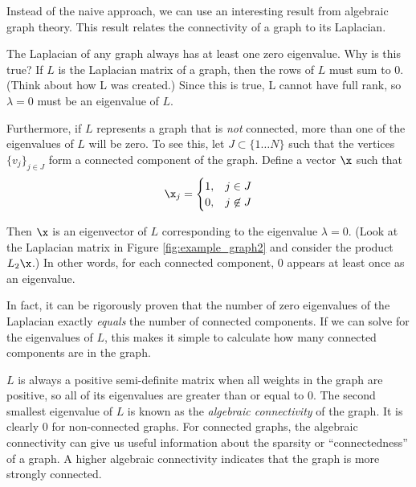 Instead of the naive approach, we can use an interesting result from algebraic graph theory.
This result relates the connectivity of a graph to its Laplacian.

The Laplacian of any graph always has at least one zero eigenvalue.
Why is this true?  If $L$ is the Laplacian matrix of a graph, then the rows of $L$ must sum to 0.
(Think about how L was created.)
Since this is true, L cannot have full rank, so $\lambda = 0$ must be an eigenvalue of $L$.

Furthermore, if $L$ represents a graph that is \textit{not} connected, more than one of the eigenvalues of $L$ will be zero.
To see this, let $J \subset \{1 \dots N\}$ such that the vertices $\{v_j\}_{j \in J}$ form a connected component of the graph.
Define a vector $\x$ such that
 \[
    \x_j = \begin{cases}
        1, & j \in J \\
        0, & j \not\in J
        \end{cases}
  \]

Then $\x$ is an eigenvector of $L$ corresponding to the eigenvalue $\lambda = 0$.
(Look at the Laplacian matrix in Figure \ref{fig:example_graph2} and consider the product $L_2 \x$.)
In other words, for each connected component, 0 appears at least once as an eigenvalue.

In fact, it can be rigorously proven that the number of zero eigenvalues of the Laplacian exactly \textit{equals} the number of connected components.
If we can solve for the eigenvalues of $L$, this makes it simple to calculate how many connected components are in the graph.

$L$ is always a positive semi-definite matrix when all weights in the graph are positive, so all of its eigenvalues are greater than or equal to 0.
The second smallest eigenvalue of $L$ is known as the \textit{algebraic connectivity} of the graph.
It is clearly 0 for non-connected graphs.
For connected graphs, the algebraic connectivity can give us useful information about the sparsity or ``connectedness'' of a graph.
A higher algebraic connectivity indicates that the graph is more strongly connected.

